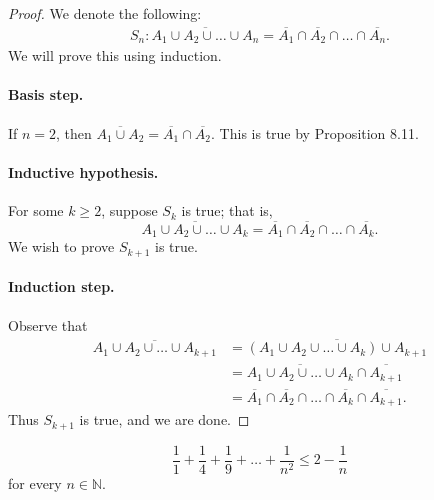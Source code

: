 \documentclass{exam}
\begin{document}
\begin{proof}
    We denote the following:
    \begin{align*}
        S_n:\overline{A_1\cup A_2\cup\dots\cup A_n}=\overline{A_1}\cap\overline{A_2}\cap\dots\cap\overline{A_n}.
    \end{align*}
    We will prove this using induction.
    \paragraph{Basis step.} If $n =2$, then $\overline{A_1\cup A_2}=\overline{A_1}\cap\overline{A_2}$. This is true by Proposition 8.11.
    \paragraph{Inductive hypothesis.} For some $k\ge 2$, suppose $S_k$ is true; that is, $$\overline{A_1\cup A_2\cup\dots\cup A_k}=\overline{A_1}\cap\overline{A_2}\cap\dots\cap\overline{A_k}.$$ We wish to prove $S_{k+1}$ is true.
    \paragraph{Induction step.} Observe that
    \begin{align*}
        \overline{A_1\cup A_2\cup\dots\cup A_{k+1}}&=\overline{(A_1\cup A_2\cup\dots\cup A_k)\cup A_{k+1}}\\
        &=\overline{A_1\cup A_2\cup\dots\cup A_k}\cap\overline{A_{k+1}}\\
        &=\overline{A_1}\cap\overline{A_2}\cap\dots\cap\overline{A_k}\cap\overline{A_{k+1}}.
    \end{align*}
    Thus $S_{k+1}$ is true, and we are done.
\end{proof}

\begin{proposition}{10.19}
    $$\frac11+\frac14+\frac19+\dots+\frac1{n^2}\le2-\frac1n$$ for every $n\in\mathbb N$.
\end{proposition}
\end{document}
